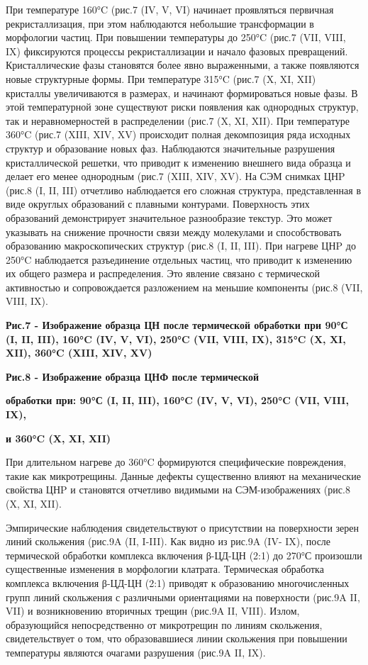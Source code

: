 При температуре 160°C (рис.7 (IV, V, VI) начинает проявляться первичная
рекристаллизация, при этом наблюдаются небольшие трансформации в
морфологии частиц. При повышении температуры до 250°C (рис.7 (VII, VIII,
IX) фиксируются процессы рекристаллизации и начало фазовых превращений.
Кристаллические фазы становятся более явно выраженными, а также
появляются новые структурные формы. При температуре 315°C (рис.7 (X, XI,
XII) кристаллы увеличиваются в размерах, и начинают формироваться новые
фазы. В этой температурной зоне существуют риски появления как
однородных структур, так и неравномерностей в распределении (рис.7 (X,
XI, XII). При температуре 360°C (рис.7 (XIII, XIV, XV) происходит полная
декомпозиция ряда исходных структур и образование новых фаз. Наблюдаются
значительные разрушения кристаллической решетки, что приводит к
изменению внешнего вида образца и делает его менее однородным (рис.7
(XIII, XIV, XV). На СЭМ снимках ЦНP (рис.8 (I, II, III) отчетливо
наблюдается его сложная структура, представленная в виде округлых
образований с плавными контурами. Поверхность этих образований
демонстрирует значительное разнообразие текстур. Это может указывать на
снижение прочности связи между молекулами и способствовать образованию
макроскопических структур (рис.8 (I, II, III). При нагреве ЦНP до 250°C
наблюдается разъединение отдельных частиц, что приводит к изменению их
общего размера и распределения. Это явление связано с термической
активностью и сопровождается разложением на меньшие компоненты (рис.8
(VII, VIII, IX).


{\bfseries Рис.7 - Изображение образца ЦН после термической обработки при
90°С (I, II, III), 160°C (IV, V, VI), 250°C (VII, VIII, IX), 315°C (X,
XI, XII), 360°C (XIII, XIV, XV)}


{\bfseries Рис.8 - Изображение образца ЦНФ после термической}

{\bfseries обработки при: 90°С (I, II, III), 160°C (IV, V, VI), 250°C (VII,
VIII, IX),}

{\bfseries и 360°C (X, XI, XII)}

При длительном нагреве до 360°C формируются специфические повреждения,
такие как микротрещины. Данные дефекты существенно влияют на
механические свойства ЦНP и становятся отчетливо видимыми на
СЭМ-изображениях (рис.8 (X, XI, XII).

Эмпирические наблюдения свидетельствуют о присутствии на поверхности
зерен линий скольжения (рис.9A (II, I-III). Как видно из рис.9A (IV-
IX), после термической обработки комплекса включения β-ЦД-ЦН (2:1) до
270°С произошли существенные изменения в морфологии клатрата.
Термическая обработка комплекса включения β-ЦД-ЦН (2:1) приводят к
образованию многочисленных групп линий скольжения с различными
ориентациями на поверхности (рис.9A II, VII) и возникновению вторичных
трещин (рис.9A II, VIII). Излом, образующийся непосредственно от
микротрещин по линиям скольжения, свидетельствует о том, что
образовавшиеся линии скольжения при повышении температуры являются
очагами разрушения (рис.9A II, IX).

